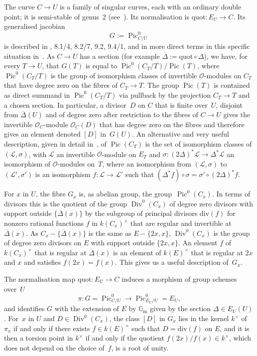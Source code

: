 \documentclass[11pt]{article}
\providecommand{\G}{}
\let\mathcal\mathscr
\theoremstyle{plain}
\theoremstyle{definition}
\numberwithin{equation}{subsection}
\let\ol\overline
\renewcommand{\G}{\mathbb G}
\newcommand{\calL}{\mathcal{L}}
\newcommand{\calO}{\mathcal{O}}
\newcommand{\divisor}{\mathrm{div}}
\newcommand{\Gm}{\G_{\mathrm{m}}}
\newcommand{\quot}{\mathrm{quot}}
\DeclareMathOperator{\Div}{Div}
\DeclareMathOperator{\Pic}{Pic}
\begin{document}
The curve $C\to U$ is a family of singular curves, each with an
ordinary double point; it is semi-stable of genus~2
(see~\cite[9.2/6, 9.2/8]{BLR}). Its normalisation is
$\quot\colon E_U \to C$. Its generalised jacobian
\[
G:=\Pic^0_{C/U}
\]
is described in \cite{BLR}, 8.1/4, 8.2/7, 9.2, 9.4/1, and
in more direct terms in this specific situation in~\cite{Howe}. As
$C\to U$ has a section (for example $\ol{\Delta}:=\quot\circ \Delta$),
we have, for every $T\to U$, that $G(T)$ is equal to $\Pic^0(C_T/T)/\Pic(T)$, where
$\Pic^0(C_T/T)$ is the group of isomorphism classes of invertible
$\calO$-modules on $C_T$ that have degree zero on the fibres
of $C_T\to T$. The group $\Pic(T)$ is contained as direct
summand in $\Pic^0(C_T/T)$ via pullback by the projection
$C_T\to T$ and a chosen section. In particular, a divisor~$D$
on $C$ that is finite over~$U$, disjoint from $\ol{\Delta}(U)$ and of
degree zero after restriction to the fibres of $C\to U$ gives the
invertible $\calO_C$-module $\calO_C(D)$ that has degree zero on the
fibres and therefore gives an element denoted $[D]$ in~$G(U)$. An
alternative and very useful description, given in detail
in~\cite{Howe}, of $\Pic(C_T)$ is the set of isomorphism
classes of $(\calL,\sigma)$, with $\calL$ an invertible $\calO$-module
on $E_T$ and $\sigma\colon (2\Delta)^*\calL\to \Delta^*\calL$
an isomorphism of $\calO$-modules on~$T$, where an isomorphism from
$(\calL,\sigma)$ to $(\calL',\sigma')$ is an isomorphism
$f\colon\calL\to\calL'$ such that $(\Delta^*f)\circ\sigma =
\sigma'\circ (2\Delta)^*f$.

For $x$ in $U$, the fibre $G_x$ is, as abelian group, the
group~$\Pic^0(C_x)$. In terms of divisors this is the quotient of the
group $\Div^0(C_x)$ of degree zero divisors with support outside
$\{\ol{\Delta}(x)\}$ by the subgroup of principal divisors
$\divisor(f)$ for nonzero rational functions $f$ in $k(C_x)^\times$
that are regular and invertible at~$\ol{\Delta}(x)$. As
$C_x-\{\ol{\Delta}(x)\}$ is the same as $E-\{2x,x\}$, $\Div^0(C_x)$ is
the group of degree zero divisors on $E$ with support outside
$\{2x,x\}$. An element $f$ of $k(C_x)^\times$ that is regular at
$\ol{\Delta}(x)$ is an element of $k(E)^\times$ that is regular at
$2x$ and $x$ and satisfies $f(2x)=f(x)$. This gives us a useful
description of~$G_x$.

The normalisation map $\quot\colon E_U\to C$ induces a morphism of
group schemes over~$U$\vspace*{-3pt}
\[
\pi\colon G = \Pic^0_{C/U} \to \Pic^0_{E_U/U} = E_U,
\]
and identifies $G$ with the extension of $E$ by $\Gm$ given by the
section $\Delta\in E_U(U)$. For~$x$ in $U$ and $D \in
\Div^0(C_x)$, the class $[D]$ in $G_x$ lies in the kernel
$k^\times$ of $\pi_x$ if and only if there exists $f \in
k(E)^\times$ such that $D=\divisor(f)$ on $E$, and it
is then a torsion point in $k^\times$ if and only if the quotient
$f(2x)/f(x) \in k^\times$, which does not depend on the
choice of~$f$, is a root of unity.
\end{document}
